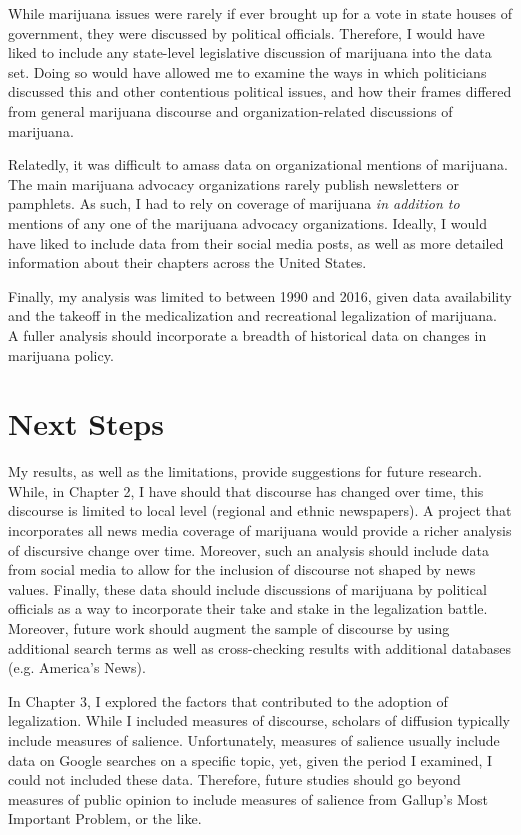 While marijuana issues were rarely if ever brought up for a vote in state houses of government, they were discussed by political officials. Therefore, I would have liked to include any state-level legislative discussion of marijuana into the data set. Doing so would have allowed me to examine the ways in which politicians discussed this and other contentious political issues, and how their frames differed from general marijuana discourse and organization-related discussions of marijuana.

Relatedly, it was difficult to amass data on organizational mentions of marijuana. The main marijuana advocacy organizations rarely publish newsletters or pamphlets. As such, I had to rely on coverage of marijuana \textit{in addition to} mentions of any one of the marijuana advocacy organizations. Ideally, I would have liked to include data from their social media posts, as well as more detailed information about their chapters across the United States.

Finally, my analysis was limited to between 1990 and 2016, given data availability and the takeoff in the medicalization and recreational legalization of marijuana. A fuller analysis should incorporate a breadth of historical data on changes in marijuana policy. 

\section{Next Steps}

My results, as well as the limitations, provide suggestions for future research. While, in Chapter 2, I have should that discourse has changed over time, this discourse is limited to local level (regional and ethnic newspapers). A project that incorporates all news media coverage of marijuana would provide a richer analysis of discursive change over time. Moreover, such an analysis should include data from social media to allow for the inclusion of discourse not shaped by news values. Finally, these data should include discussions of marijuana by political officials as a way to incorporate their take and stake in the legalization battle. Moreover, future work should augment the sample of discourse by using additional search terms as well as cross-checking results with additional databases (e.g. America's News). 

In Chapter 3, I explored the factors that contributed to the adoption of legalization. While I included measures of discourse, scholars of diffusion typically include measures of salience. Unfortunately, measures of salience usually include data on Google searches on a specific topic, yet, given the period I examined, I could not included these data. Therefore, future studies should go beyond measures of public opinion to include measures of salience from Gallup's Most Important Problem, or the like. 

